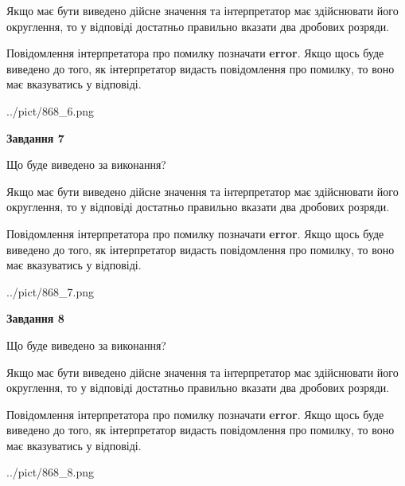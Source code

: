 \documentclass[12pt, ukrainian]{article}
\begin{document}
{\begin {Large}
Якщо має бути виведено дійсне значення та інтерпретатор має здійснювати його округлення, 
то у відповіді достатньо правильно вказати два дробових розряди.

Повідомлення інтерпретатора про помилку позначати \textbf{error}.
Якщо щось буде виведено до того, як інтерпретатор видасть повідомлення про помилку, 
то воно має вказуватись у відповіді. \par

\begin{center}
	{../pict/868_6.png}
\end{center}
\newpage

{\begin {center}\textbf{Завдання 7}\end {center}}\par
Що буде виведено за виконання? \par

Якщо має бути виведено дійсне значення та інтерпретатор має здійснювати його округлення, 
то у відповіді достатньо правильно вказати два дробових розряди.

Повідомлення інтерпретатора про помилку позначати \textbf{error}.
Якщо щось буде виведено до того, як інтерпретатор видасть повідомлення про помилку, 
то воно має вказуватись у відповіді. \par

\begin{center}
	{../pict/868_7.png}
\end{center}
\newpage

{\begin {center}\textbf{Завдання 8}\end {center}}\par
Що буде виведено за виконання? \par

Якщо має бути виведено дійсне значення та інтерпретатор має здійснювати його округлення, 
то у відповіді достатньо правильно вказати два дробових розряди.

Повідомлення інтерпретатора про помилку позначати \textbf{error}.
Якщо щось буде виведено до того, як інтерпретатор видасть повідомлення про помилку, 
то воно має вказуватись у відповіді. \par

\begin{center}
	{../pict/868_8.png}
\end{center}
\newpage


\end{Large}}
\end{document}
